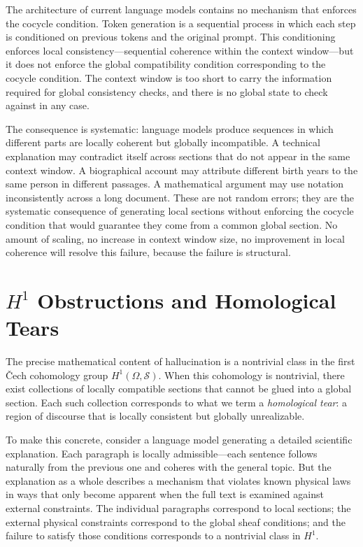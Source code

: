 \documentclass[11pt, oneside]{article}
\begin{document}
The architecture of current language models contains no mechanism that enforces the cocycle condition. Token generation is a sequential process in which each step is conditioned on previous tokens and the original prompt. This conditioning enforces local consistency---sequential coherence within the context window---but it does not enforce the global compatibility condition corresponding to the cocycle condition. The context window is too short to carry the information required for global consistency checks, and there is no global state to check against in any case.

The consequence is systematic: language models produce sequences in which different parts are locally coherent but globally incompatible. A technical explanation may contradict itself across sections that do not appear in the same context window. A biographical account may attribute different birth years to the same person in different passages. A mathematical argument may use notation inconsistently across a long document. These are not random errors; they are the systematic consequence of generating local sections without enforcing the cocycle condition that would guarantee they come from a common global section. No amount of scaling, no increase in context window size, no improvement in local coherence will resolve this failure, because the failure is structural.

\section{$H^1$ Obstructions and Homological Tears}

The precise mathematical content of hallucination is a nontrivial class in the first \v{C}ech cohomology group $H^1(\Omega, \mathcal{S})$. When this cohomology is nontrivial, there exist collections of locally compatible sections that cannot be glued into a global section. Each such collection corresponds to what we term a \emph{homological tear}: a region of discourse that is locally consistent but globally unrealizable.

To make this concrete, consider a language model generating a detailed scientific explanation. Each paragraph is locally admissible---each sentence follows naturally from the previous one and coheres with the general topic. But the explanation as a whole describes a mechanism that violates known physical laws in ways that only become apparent when the full text is examined against external constraints. The individual paragraphs correspond to local sections; the external physical constraints correspond to the global sheaf conditions; and the failure to satisfy those conditions corresponds to a nontrivial class in $H^1$.
\end{document}
